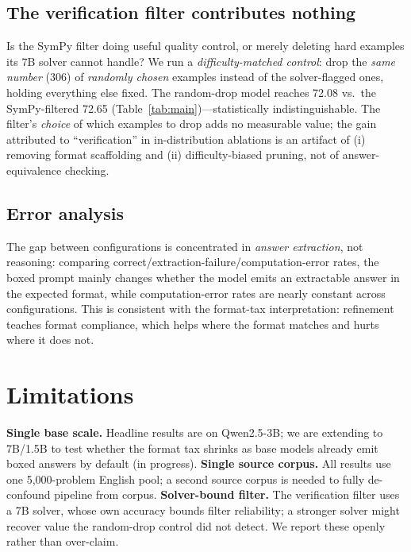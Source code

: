 \documentclass[letterpaper]{article} %
\begin{document}
\subsection{The verification filter contributes nothing}\label{sec:filter}
Is the SymPy filter doing useful quality control, or merely deleting hard examples its 7B solver cannot handle? We run a \emph{difficulty-matched control}: drop the \emph{same number} (306) of \emph{randomly chosen} examples instead of the solver-flagged ones, holding everything else fixed. The random-drop model reaches 72.08 vs.\ the SymPy-filtered 72.65 (Table~\ref{tab:main})---statistically indistinguishable. The filter's \emph{choice} of which examples to drop adds no measurable value; the gain attributed to ``verification'' in in-distribution ablations is an artifact of (i) removing format scaffolding and (ii) difficulty-biased pruning, not of answer-equivalence checking.

\subsection{Error analysis}
The gap between configurations is concentrated in \emph{answer extraction}, not reasoning: comparing correct/extraction-failure/computation-error rates, the boxed prompt mainly changes whether the model emits an extractable answer in the expected format, while computation-error rates are nearly constant across configurations. This is consistent with the format-tax interpretation: refinement teaches format compliance, which helps where the format matches and hurts where it does not.

\section{Limitations}\label{sec:limitations}
\textbf{Single base scale.} Headline results are on Qwen2.5-3B; we are extending to 7B/1.5B to test whether the format tax shrinks as base models already emit boxed answers by default (in progress). \textbf{Single source corpus.} All results use one 5{,}000-problem English pool; a second source corpus is needed to fully de-confound pipeline from corpus. \textbf{Solver-bound filter.} The verification filter uses a 7B solver, whose own accuracy bounds filter reliability; a stronger solver might recover value the random-drop control did not detect. We report these openly rather than over-claim.
\end{document}
